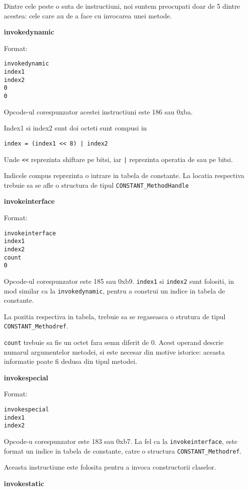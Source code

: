 Dintre cele peste o suta de instructiuni, noi suntem preocupati doar de
5 dintre acestea: cele care au de a face cu invocarea unei metode.

\textbf{invokedynamic}

Format:
\begin{verbatim}
invokedynamic
index1
index2
0
0
\end{verbatim}

Opcode-ul corespunzator acestei instructiuni este 186 sau
0xba.

Index1 si index2 sunt doi octeti sunt compusi in
\begin{lstlisting}
index = (index1 << 8) | index2
\end{lstlisting}
Unde \texttt{<<} reprezinta shiftare pe bitsi, iar \texttt{|} reprezinta operatia de sau pe bitsi.

Indicele compus reprezinta o intrare in tabela de constante. La locatia
respectiva trebuie sa se afle o structura de tipul
\texttt{CONSTANT\_MethodHandle}

\textbf{invokeinterface}

Format:
\begin{verbatim}
invokeinterface
index1
index2
count
0
\end{verbatim}

Opcode-ul corespunzator este 185 sau 0xb9.
\texttt{index1} si \texttt{index2} sunt folositi, in mod similar ca la
\texttt{invokedynamic}, pentru a construi un indice in tabela
de constante.

La pozitia respectiva in tabela, trebuie sa se regaseasca o strutura de
tipul \texttt{CONSTANT\_Methodref}.

\texttt{count} trebuie sa fie un octet fara semn diferit de 0. Acest
operand descrie numarul argumentelor metodei, si este necesar din motive
istorice: aceasta informatie poate fi dedusa din tipul metodei.

\textbf{invokespecial}

Format:
\begin{verbatim}
invokespecial
index1
index2
\end{verbatim}

Opcode-u corespunzator este 183 sau 0xb7. La fel ca la
\texttt{invokeinterface}, este format un indice in tabela de constante,
catre o structura \texttt{CONSTANT\_Methodref}.

Aceasta instructiune este folosita pentru a invoca constructorii
claselor.

\textbf{invokestatic}

